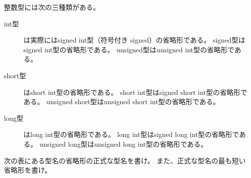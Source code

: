 \documentclass[12pt,a4j]{jarticle}
\newcounter{toi}
\def\toi{%
\bigskip\bigskip\noindent
\addtocounter{toi}{1}
\shadowbox{\bfseries\large 問\thetoi}
\nopagebreak[4]\bigskip\nopagebreak[4]
}
\begin{document}
\begin{multicols}{2}
 
 整数型には次の三種類がある。

\begin{description}
 \item[int型]は実際にはsigned int型（符号付き signed）の省略形である。
 signed型はsigned int型の省略形である。
 unsigned型はunsigned int型の省略形である。

 \item[short型]はshort int型の省略形である。
 short int型はsigned short int型の省略形である。
 unsigned short型はunsigned short int型の省略形である。

 \item[long型]はlong int型の省略形である。
 long int型はsigned long int型の省略形である。
 unsigned long型はunsigned long int型の省略形である。
\end{description}


 \mbox{}



 次の表にある型名の省略形の正式な型名を書け。
 また、正式な型名の最も短い省略形を書け。

 \begin{center}
 \end{center}
\end{multicols}




\toi
\end{document}
